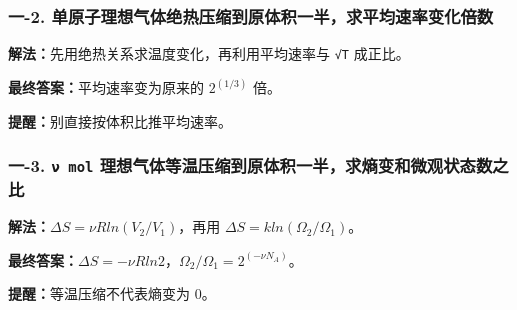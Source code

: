 \documentclass[12pt,a4paper]{ctexart}
\begin{document}
\subsubsection*{一-2. 单原子理想气体绝热压缩到原体积一半，求平均速率变化倍数}
\begin{tcolorbox}[colback=gray!2!white,colframe=black!60,title={题目}]

\end{tcolorbox}
\begin{tcolorbox}[colback=blue!2!white,colframe=blue!55!black,title={完整答案}]
\textbf{解法：}先用绝热关系求温度变化，再利用平均速率与 \texttt{√T} 成正比。\par
\textbf{最终答案：}平均速率变为原来的 \(2^(1/3)\) 倍。\par

\end{tcolorbox}
\begin{tcolorbox}[colback=red!2!white,colframe=red!55!black,title={易错点}]
\textbf{提醒：}别直接按体积比推平均速率。\par
\end{tcolorbox}

\subsubsection*{一-3. \texttt{ν mol} 理想气体等温压缩到原体积一半，求熵变和微观状态数之比}
\begin{tcolorbox}[colback=gray!2!white,colframe=black!60,title={题目}]

\end{tcolorbox}
\begin{tcolorbox}[colback=blue!2!white,colframe=blue!55!black,title={完整答案}]
\textbf{解法：}\(ΔS=νR ln(V_2/V_1)\)，再用 \(ΔS=k ln(Ω_2/Ω_1)\)。\par
\textbf{最终答案：}\(ΔS=-νR ln2\)，\(Ω_2/Ω_1=2^(-νN_A)\)。\par

\end{tcolorbox}
\begin{tcolorbox}[colback=red!2!white,colframe=red!55!black,title={易错点}]
\textbf{提醒：}等温压缩不代表熵变为 0。\par
\end{tcolorbox}
\end{document}
